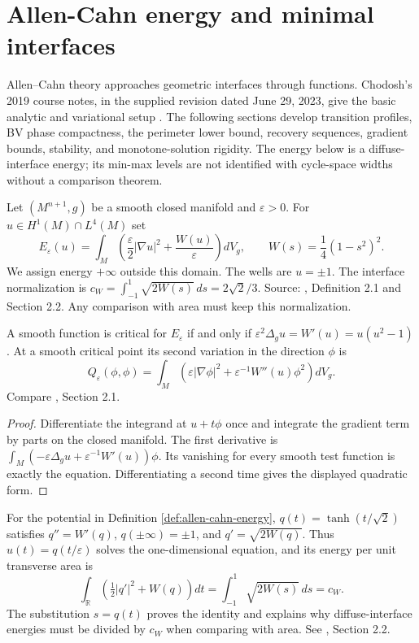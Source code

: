 \chapter{Allen-Cahn energy and minimal interfaces}\label{sec:allen-cahn}
Allen--Cahn theory approaches geometric interfaces through functions. Chodosh's 2019 course notes, in the supplied revision dated June 29, 2023, give the basic analytic and variational setup \cite{ChAC}. The following sections develop transition profiles, BV phase compactness, the perimeter lower bound, recovery sequences, gradient bounds, stability, and monotone-solution rigidity. The energy below is a diffuse-interface energy; its min-max levels are not identified with cycle-space widths without a comparison theorem.

\begin{definition}\label{def:allen-cahn-energy}
Let $(M^{n+1},g)$ be a smooth closed manifold and $\varepsilon>0$. For $u\in H^1(M)\cap L^4(M)$ set
\[
 E_\varepsilon(u)=\int_M\left(\frac\varepsilon2|\nabla u|^2+\frac{W(u)}\varepsilon\right)dV_g,
 \qquad W(s)=\frac14(1-s^2)^2.
\]
We assign energy $+\infty$ outside this domain. The wells are $u=\pm1$. The interface normalization is
$c_W=\int_{-1}^{1}\sqrt{2W(s)}\,ds=2\sqrt2/3$.
Source: \cite{ChAC}, Definition 2.1 and Section 2.2. Any comparison with area must keep this normalization.
\end{definition}

\begin{proposition}\label{prop:allen-cahn-variation}
A smooth function is critical for $E_\varepsilon$ if and only if
$\varepsilon^2\Delta_g u=W'(u)=u(u^2-1)$.
At a smooth critical point its second variation in the direction $\phi$ is
\[
 Q_\varepsilon(\phi,\phi)=\int_M\left(\varepsilon|\nabla\phi|^2+\varepsilon^{-1}W''(u)\phi^2\right)dV_g.
\]
Compare \cite{ChAC}, Section 2.1.
\end{proposition}
\begin{proof}
Differentiate the integrand at $u+t\phi$ once and integrate the gradient term by parts on the closed manifold. The first derivative is
$\int_M(-\varepsilon\Delta_g u+\varepsilon^{-1}W'(u))\phi$.
Its vanishing for every smooth test function is exactly the equation. Differentiating a second time gives the displayed quadratic form.
\end{proof}

\begin{example}\label{ex:allen-cahn-layer}
For the potential in Definition \ref{def:allen-cahn-energy},
$q(t)=\tanh(t/\sqrt2)$ satisfies $q''=W'(q)$, $q(\pm\infty)=\pm1$, and $q'=\sqrt{2W(q)}$.
Thus $u(t)=q(t/\varepsilon)$ solves the one-dimensional equation, and its energy per unit transverse area is
\[
 \int_{\mathbb R}\left(\tfrac12|q'|^2+W(q)\right)dt
 =\int_{-1}^{1}\sqrt{2W(s)}\,ds=c_W.
\]
The substitution $s=q(t)$ proves the identity and explains why diffuse-interface energies must be divided by $c_W$ when comparing with area. See \cite{ChAC}, Section 2.2.
\end{example}


